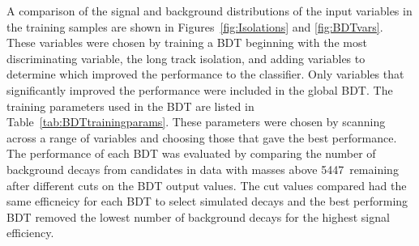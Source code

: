 A comparison of the signal and background distributions of the input variables in the training samples are shown in Figures~\ref{fig:Isolations} and \ref{fig:BDTvars}. These variables were chosen by training a BDT beginning with the most discriminating variable, the long track isolation, and adding variables to determine which improved the performance to the classifier. Only variables that significantly improved the performance were included in the global BDT. The training parameters used in the BDT are listed in Table~\ref{tab:BDTtrainingparams}. These parameters were chosen by scanning across a range of variables and choosing those that gave the best performance. 
The performance of each BDT was evaluated by comparing the number of background decays from \bmumu candidates in data with masses above 5447~\mevcc remaining after different cuts on the BDT output values. The cut values compared had the same efficneicy for each BDT to select simulated \bsmumu decays and the best performing BDT removed the lowest number of background decays for the highest signal efficiency.
